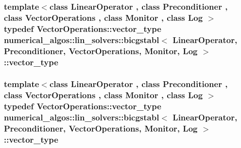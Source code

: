 \hypertarget{classnumerical__algos_1_1lin__solvers_1_1bicgstabl_add3b80f2998237878d4cbe24478bcf53}{
\subsubsection[{vector\-\_\-type}]{\setlength{\rightskip}{0pt plus 5cm}template$<$class Linear\-Operator , class Preconditioner , class Vector\-Operations , class Monitor , class Log $>$ typedef Vector\-Operations\-::vector\-\_\-type {\bf numerical\-\_\-algos\-::lin\-\_\-solvers\-::bicgstabl}$<$ Linear\-Operator, Preconditioner, Vector\-Operations, Monitor, Log $>$\-::{\bf vector\-\_\-type}}}\label{classnumerical__algos_1_1lin__solvers_1_1bicgstabl_add3b80f2998237878d4cbe24478bcf53}
\hypertarget{classnumerical__algos_1_1lin__solvers_1_1bicgstabl_add3b80f2998237878d4cbe24478bcf53}{
\subsubsection[{vector\-\_\-type}]{\setlength{\rightskip}{0pt plus 5cm}template$<$class Linear\-Operator , class Preconditioner , class Vector\-Operations , class Monitor , class Log $>$ typedef Vector\-Operations\-::vector\-\_\-type {\bf numerical\-\_\-algos\-::lin\-\_\-solvers\-::bicgstabl}$<$ Linear\-Operator, Preconditioner, Vector\-Operations, Monitor, Log $>$\-::{\bf vector\-\_\-type}}}\label{classnumerical__algos_1_1lin__solvers_1_1bicgstabl_add3b80f2998237878d4cbe24478bcf53}


